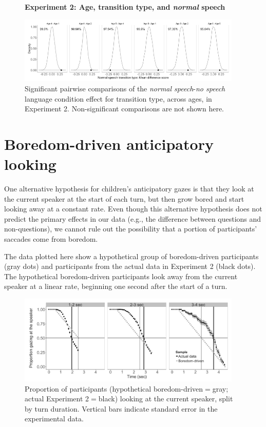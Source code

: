 \documentclass[authoryear, 12pt]{elsarticle}
\begin{document}
\begin{figure}
\begin{center}
\textbf{Experiment 2: Age, transition type, and \textit{normal} speech}\par\medskip
\includegraphics[width=0.95\textwidth]{figures/E2-child-randvsreal-ttest-normaltypesages.png}
\end{center}
\caption{Significant pairwise comparisons of the \textit{normal speech}-\textit{no speech} language condition effect for transition type, across ages, in Experiment 2. Non-significant comparisons are not shown here.} 
\label{fig:E2-lgagetypeinteraction}
\end{figure}

\section{Boredom-driven anticipatory looking}
\label{sec:boredlooks}
\setcounter{figure}{0}  

One alternative hypothesis for children's anticipatory gazes is that they look at the current speaker at the start of each turn, but then grow bored and start looking away at a constant rate. Even though this alternative hypothesis does not predict the primary effects in our data (e.g., the difference between questions and non-questions), we cannot rule out the possibility that a portion of participants' saccades come from boredom.

The data plotted here show a hypothetical group of boredom-driven participants (gray dots) and participants from the actual data in Experiment 2 (black dots). The hypothetical boredom-driven participants look away from the current speaker at a linear rate, beginning one second after the start of a turn. 

\begin{figure}[!htb]
\begin{center}
\includegraphics[width=0.95\textwidth]{figures/boredom-hypothesis.png}
\end{center}
\caption{Proportion of participants (hypothetical boredom-driven$=$gray; actual Experiment 2$=$black) looking at the current speaker, split by turn duration. Vertical bars indicate standard error in the experimental data.} 
\label{fig:boredomhypothesis}
\end{figure}
\end{document}
